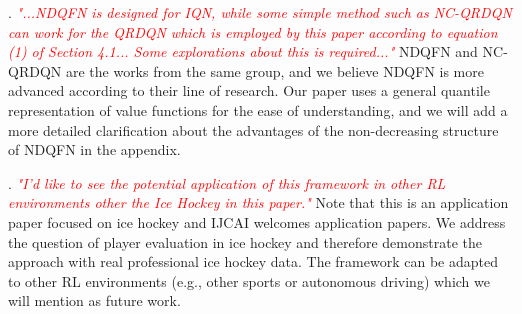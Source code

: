 \documentclass{article}
\begin{document}
. \textcolor{red}{\it "...NDQFN is designed for IQN, while some simple method such as NC-QRDQN can work for the QRDQN which is employed by this paper according to equation (1) of Section 4.1... Some explorations about this is required..."}
NDQFN and NC-QRDQN are the works from the same group, and we believe NDQFN is more advanced according to their line of research. Our paper uses a general quantile representation of value functions for the ease of understanding, and we will add a more detailed clarification about the advantages of the non-decreasing structure of NDQFN in the appendix.

. \textcolor{red}{\it "I'd like to see the potential application of this framework in other RL environments other the Ice Hockey in this paper."} 
Note that this is an application paper focused on ice hockey and IJCAI welcomes application papers.  We address the question of player evaluation in ice hockey and therefore demonstrate the approach with real professional ice hockey data. The framework can be adapted to other RL environments (e.g., other sports or autonomous driving) which we will mention as future work.

\vspace{-0.1in}
\end{document}
